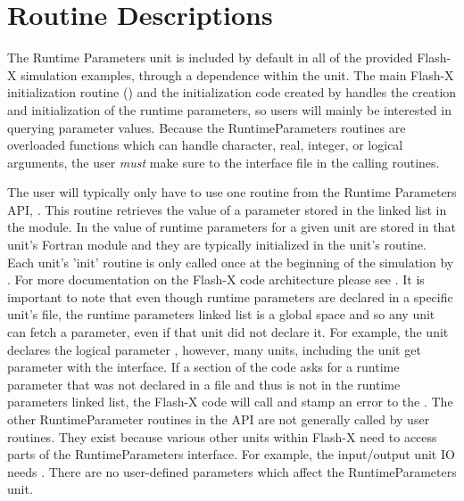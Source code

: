 \section{Routine Descriptions}
The Runtime Parameters unit is included by default in all of the
provided Flash-X simulation examples, through a dependence within the
 unit.
The main Flash-X initialization routine ()
and the initialization code created by  handles the
creation and initialization of the runtime parameters,
so users will mainly be interested in querying
parameter values.
Because the RuntimeParameters routines are overloaded functions
which can handle character, real, integer, or logical arguments, the
user \emph{must} make sure to  the interface file
 in the calling routines.

The user will typically only have to use one routine from the Runtime
Parameters API, 
\newline
{}.  This
routine retrieves the value of a parameter stored in the linked list
in the  module.  In \flashx the
value of runtime parameters for a given unit are stored in that unit's
 Fortran module and they are typically initialized in the unit's
 routine.  Each unit's 'init' routine is only
called once at the beginning of the simulation by . For more documentation
on the Flash-X code architecture please see .
It is important to note that even though runtime parameters are declared in a
specific unit's  file, the runtime parameters linked list is a global
space and so any unit can fetch a parameter, even if that unit did not declare it.
For example, the  unit declares the logical parameter ,
however, many units, including the  unit get  parameter with
the  interface.  If a
section of the code asks for a runtime parameter that was not declared
in a  file and thus is not in the runtime parameters
linked list, the Flash-X code will call  
and stamp an error to the .  The other RuntimeParameter
routines in the API are not generally called by user routines.
They exist because various other units within Flash-X need to
access parts of the RuntimeParameters interface.  For example, the input/output unit \unit{IO} needs
.  There are no user-defined parameters which affect the \unit{RuntimeParameters} unit.

